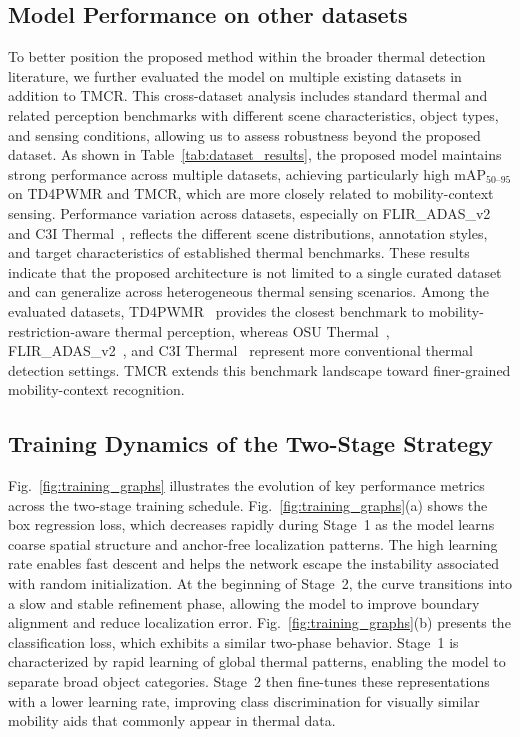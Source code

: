 \documentclass[journal,twoside,web]{ieeecolor}
\begin{document}
\subsection{Model Performance on other datasets}
To better position the proposed method within the broader thermal detection literature, we further evaluated the model on multiple existing datasets in addition to TMCR. This cross-dataset analysis includes standard thermal and related perception benchmarks with different scene characteristics, object types, and sensing conditions, allowing us to assess robustness beyond the proposed dataset. As shown in Table~\ref{tab:dataset_results}, the proposed model maintains strong performance across multiple datasets, achieving particularly high mAP$_{50\text{--}95}$ on TD4PWMR and TMCR, which are more closely related to mobility-context sensing. Performance variation across datasets, especially on FLIR\_ADAS\_v2~\cite{flir_adas_dataset} and C3I Thermal~\cite{jf21-rt22-22}, reflects the different scene distributions, annotation styles, and target characteristics of established thermal benchmarks. These results indicate that the proposed architecture is not limited to a single curated dataset and can generalize across heterogeneous thermal sensing scenarios. Among the evaluated datasets, TD4PWMR~\cite{ni2025thermal} provides the closest benchmark to mobility-restriction-aware thermal perception, whereas OSU Thermal~\cite{davis2007background}, FLIR\_ADAS\_v2~\cite{flir_adas_dataset}, and C3I Thermal~\cite{jf21-rt22-22} represent more conventional thermal detection settings. TMCR extends this benchmark landscape toward finer-grained mobility-context recognition.



\subsection{Training Dynamics of the Two-Stage Strategy}
Fig.~\ref{fig:training_graphs} illustrates the evolution of key performance metrics across the two-stage training schedule. Fig.~\ref{fig:training_graphs}(a) shows the box regression loss, which decreases rapidly during Stage~1 as the model learns coarse spatial structure and anchor-free localization patterns. The high learning rate enables fast descent and helps the network escape the instability associated with random initialization. At the beginning of Stage~2, the curve transitions into a slow and stable refinement phase, allowing the model to improve boundary alignment and reduce localization error. Fig.~\ref{fig:training_graphs}(b) presents the classification loss, which exhibits a similar two-phase behavior. Stage~1 is characterized by rapid learning of global thermal patterns, enabling the model to separate broad object categories. Stage~2 then fine-tunes these representations with a lower learning rate, improving class discrimination for visually similar mobility aids that commonly appear in thermal data.
\end{document}
